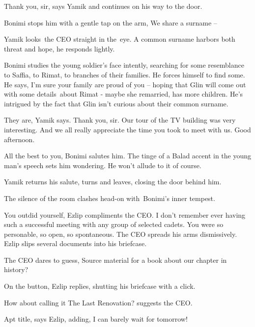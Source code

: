 \documentclass[letterpaper]{article}
\begin{document}
{\textquotedbl}Thank you, sir,{\textquotedbl} says Yamik and continues on his way to the door. 

Bonimi\textcolor{red}{ }stops\textcolor{red}{ }him with a gentle tap on the arm, {\textquotedbl}We share a surname
--{\textquotedbl} 

Yamik looks~the CEO straight in the~eye. {\textquotedbl}A common surname harbors both threat and hope,{\textquotedbl} he
responds lightly.

Bonimi studies the young soldier's face intently, searching for some resemblance to Saffia, to Rimat, to branches of
their families. He forces himself to find some. He says, {\textquotedbl}I'm sure your family\textcolor{red}{ }are proud
of you --{\textquotedbl} hoping that Glin will come out with some details~about Rimat - maybe she remarried, has more
children. He's intrigued by the fact that Glin isn't curious about their common surname.

{\textquotedbl}They are,{\textquotedbl} Yamik says. {\textquotedbl}Thank you, sir. Our tour of the TV building was very
interesting. And we all really appreciate the time you took to meet with us. Good afternoon.{\textquotedbl} 

{\textquotedbl}All the best to you,{\textquotedbl} Bonimi salutes him. The tinge of a Balad accent in the young man's
speech sets him wondering. He won't allude to it of course. 

Yamik returns his salute, turns and leaves, closing the door behind him.

The silence of the room clashes head-on with~Bonimi's inner tempest.

{\textquotedbl}You outdid yourself,{\textquotedbl} Ezlip compliments the CEO. {\textquotedbl}I don't remember ever
having such a successful meeting with any group of selected cadets. You were so personable, so open, so
spontaneous.{\textquotedbl} The CEO spreads his arms dismissively. Ezlip slips several documents into his
briefcase.\textbf{ }

The CEO dares to guess, {\textquotedbl}Source material for a book about our chapter in history?{\textquotedbl} 

{\textquotedbl}On the button,{\textquotedbl} Ezlip replies, shutting his briefcase with a click. 

{\textquotedbl}How about calling it The Last Renovation?{\textquotedbl} suggests the CEO. 

{\textquotedbl}Apt title,{\textquotedbl} says Ezlip, adding, {\textquotedbl}I can barely wait for
tomorrow!{\textquotedbl}
\end{document}
